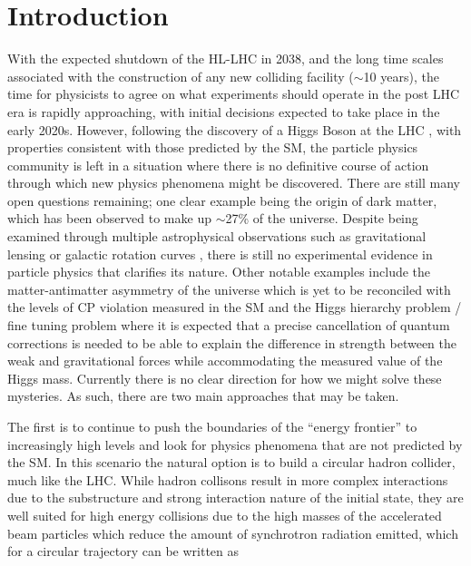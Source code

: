 \chapter{Introduction}

With the expected shutdown of the \ac{HL-LHC} in 2038, and the long time scales associated with the construction of any new colliding facility ($\sim$10 years), the time for physicists to agree on what experiments should operate in the post \ac{LHC} era is rapidly approaching, with initial decisions expected to take place in the early 2020s. However, following the discovery of a Higgs Boson at the \ac{LHC} \cite{:2012gk,Chatrchyan:2012xdj}, with properties consistent with those predicted by the \ac{SM}\cite{Khachatryan:2014jba,Aad:2015gba,Khachatryan:2016vau}, the particle physics community is left in a situation where there is no definitive course of action through which new physics phenomena might be discovered. There are still many open questions remaining; one clear example being the origin of dark matter, which has been observed to make up $\sim$27\% of the universe. Despite being examined through multiple astrophysical observations such as gravitational lensing or galactic rotation curves \cite{Trimble:1987ee}, there is still no experimental evidence in particle physics that clarifies its nature. Other notable examples include the matter-antimatter asymmetry of the universe which is yet to be reconciled with the levels of CP violation measured in the \ac{SM}\cite{Patrignani:2016xqp} and the Higgs hierarchy problem / fine tuning problem\cite{Baer:2012cf} where it is expected that a precise cancellation of quantum corrections is needed to be able to explain the difference in strength between the weak and gravitational forces while accommodating the measured value of the Higgs mass. Currently there is no clear direction for how we might solve these mysteries. As such, there are two main approaches that may be taken.

The first is to continue to push the boundaries of the ``energy frontier'' to increasingly high levels and look for physics phenomena that are not predicted by the \ac{SM}. In this scenario the natural option is to build a circular hadron collider, much like the \ac{LHC}. While hadron collisons result in more complex interactions due to the substructure and strong interaction nature of the initial state, they are well suited for high energy collisions due to the high masses of the accelerated beam particles which reduce the amount of synchrotron radiation emitted, which for a circular trajectory can be written as

